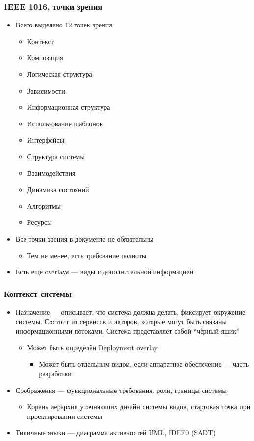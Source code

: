 \documentclass[xetex,mathserif,serif]{beamer}
\begin{document}
	\begin{frame}
		\frametitle{IEEE 1016, точки зрения}
		\begin{itemize}
			\item Всего выделено 12 точек зрения
			\begin{itemize}
				\item Контекст
				\item Композиция
				\item Логическая структура
				\item Зависимости
				\item Информационная структура
				\item Использование шаблонов
				\item Интерфейсы
				\item Структура системы
				\item Взаимодействия
				\item Динамика состояний
				\item Алгоритмы
				\item Ресурсы
			\end{itemize}
			\item Все точки зрения в документе не обязательны
			\begin{itemize}
				\item Тем не менее, есть требование полноты
			\end{itemize}
			\item Есть ещё overlays --- виды с дополнительной информацией
		\end{itemize}
	\end{frame}

	\begin{frame}
		\frametitle{Контекст системы}
		\begin{itemize}
			\item Назначение --- описывает, что система должна делать, фиксирует окружение системы. Состоит из сервисов и акторов, которые могут быть связаны информационными потоками. Система представляет собой ``чёрный ящик''
			\begin{itemize}
				\item Может быть определён Deployment overlay
				\begin{itemize}
					\item Может быть отдельным видом, если аппаратное обеспечение --- часть разработки
				\end{itemize}
			\end{itemize}
			\item Соображения --- функциональные требования, роли, границы системы
			\begin{itemize}
				\item Корень иерархии уточняющих дизайн системы видов, стартовая точка при проектировании системы
			\end{itemize}
			\item Типичные языки --- диаграмма активностей UML, IDEF0 (SADT)
		\end{itemize}
	\end{frame}
\end{document}
